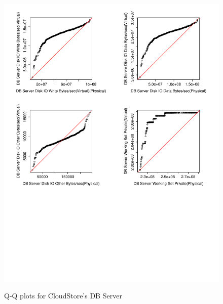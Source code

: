 \begin{figure}[tbh]
	\centering
	{\includegraphics[width=1.0\textwidth]{figures/appendix/qq_plots/CloudStore/DB_Server/Fourth_four.pdf}}
	\caption{Q-Q plots for CloudStore's DB Server}
\end{figure}





